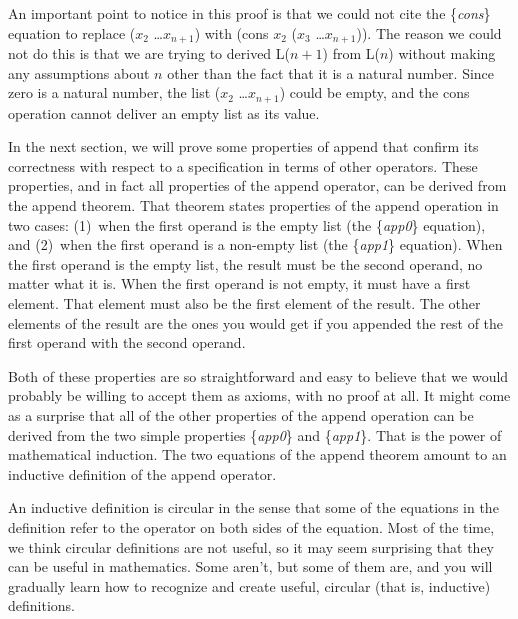 An important point to notice in this proof is that we could not cite the \{\emph{cons}\} equation to replace ($x_2$ \dots $x_{n+1}$) with (cons $x_2$ ($x_3$ \dots $x_{n+1}$)). The reason we could not do this is that we are trying to derived L($n+1$) from L($n$) without making any assumptions about $n$ other than the fact that it is a natural number. Since zero is a natural number, the list ($x_2$ \dots $x_{n+1}$) could be empty, and the cons operation cannot deliver an empty list as its value.

In the next section, we will prove some properties of append that confirm its correctness with respect to a specification in terms of other operators. These properties, and in fact all properties of the append operator, can be derived from the append theorem. That theorem states properties of the append operation in two cases: (1)~when the first operand is the empty list (the \{\emph{app0}\} equation), and (2)~when the first operand is a non-empty list (the \{\emph{app1}\} equation). When the first operand is the empty list, the result must be the second operand, no matter what it is. When the first operand is not empty, it must have a first element. That element must also be the first element of the result. The other elements of the result are the ones you would get if you appended the rest of the first operand with the second operand.

Both of these properties are so straightforward and easy to believe that we would probably be willing to accept them as axioms, with no proof at all. It might come as a surprise that all of the other properties of the append operation can be derived from the two simple properties \{\emph{app0}\} and \{\emph{app1}\}. That is the power of mathematical induction. The two equations of the append theorem amount to an inductive definition of the append operator.

An inductive definition is circular in the sense that some of the equations in the definition refer to the operator on both sides of the equation. Most of the time, we think circular definitions are not useful, so it may seem surprising that they can be useful in mathematics. Some aren't, but some of them are, and you will gradually learn how to recognize and create useful, circular (that is, inductive) definitions.

